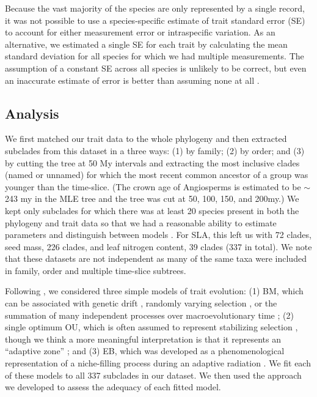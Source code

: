 Because the vast majority of the species are only represented by a single
record, it was not possible to use a species-specific estimate of
trait standard error (SE) to account for either measurement error or
intraspecific variation.  As an alternative, we estimated a single SE for each trait
by calculating the mean
standard deviation for all species for which we had multiple
measurements. The assumption of a constant SE across all species is
unlikely to be correct, but even an
inaccurate estimate of error is better than assuming none at all
\citep{Hansen2012SysBio}. 

\subsection{Analysis}

We first matched our trait data to the whole phylogeny and then extracted subclades from this dataset in a three ways: (1) by family; (2) by order; and (3) by cutting the tree at 50 My intervals and extracting the most inclusive clades (named or unnamed) for which the most recent common ancestor of a group was younger than the time-slice. 
(The crown age of Angiosperms is estimated to be $\sim$243 my in the MLE tree and the tree was cut at 50, 100, 150, and 200my.) We kept only subclades for which there was at least 20 species present in both the phylogeny and trait data so that we had a reasonable ability to estimate parameters and distinguish between models \citep{Boettiger2012, SlaterPennell}. 
For SLA, this left us with 72 clades, seed mass, 226 clades, and leaf nitrogen content, 39 clades (337 in total). We note that these datasets are not independent as many of the same taxa were included in family, order and multiple time-slice subtrees. 

Following \citet{Harmon2010}, we considered three simple models of trait evolution: (1) BM, which can be associated with genetic drift \citep{Lande1976, Felsenstein1988, LynchHill1986, Lynch1990, HansenMartins1996}, randomly varying selection \citep{Felsenstein1973}, or the summation of many independent processes over macroevolutionary time \citep{HansenMartins1996, Uyeda2011, PennellPE}; (2) single optimum OU, which is often assumed to represent stabilizing selection \citep[following][]{Lande1976}, though we think a more meaningful interpretation is that it represents an ``adaptive zone'' \citep{Hansen2012book, PennellHarmon}; and (3) EB, which was developed as a phenomenological representation of a niche-filling process during an adaptive radiation \citep{Blomberg2003, Harmon2010}. We fit each of these models to all 337 subclades in our dataset. We then used the approach we developed to assess the adequacy of each fitted model. 

